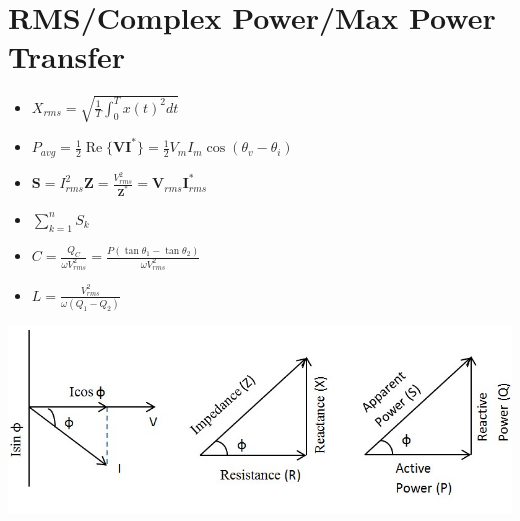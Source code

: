 \documentclass[10pt,letterpaper,final,twoside,notitlepage]{article}
\renewcommand{\Re}{\operatorname{Re}} %
\begin{document}
\section*{RMS/Complex Power/Max Power Transfer} \label{sec:Complex Power}
	\vspace{-6mm}
	\begin{multicols}{2}
		\begin{itemize}[noitemsep]
			\item $X_{rms}=\sqrt{\frac{1}{T} \int_{0}^{T} x(t)^2 dt}$
			\item $P_{avg}=\frac{1}{2} \Re\lbrace \mathbf{V} \mathbf{I}^* \rbrace=\frac{1}{2}V_{m}I_{m}\cos \left(\theta_v -\theta_i \right)$
			\item $\mathbf{S} = I_{rms}^2\mathbf{Z} = \frac{V_{rms}^2}{\mathbf{Z}^*} = \mathbf{V}_{rms}\mathbf{I}_{rms}^*$ \vspace{1.2mm}
			\item $\sum_{k=1}^{n} S_{k}$ \vspace{1.2mm}
			\item $C = \frac{Q_{C}}{\omega V_{rms}^2} = \frac{P\left( \tan \theta_1 - \tan \theta_2 \right)}{\omega V_{rms}^2}$ \vspace{1.2mm}
			\item $L=\frac{V_{rms}^2}{\omega \left(Q_1 - Q_2 \right)}$
		\end{itemize}

		\columnbreak
		
		\includegraphics[scale=0.375]{Phasor_Power_Triangle.jpg} %
		\label{fig:Phasor/Power Triangle}
	\end{multicols}
	\vspace{-4mm}
\end{document}
